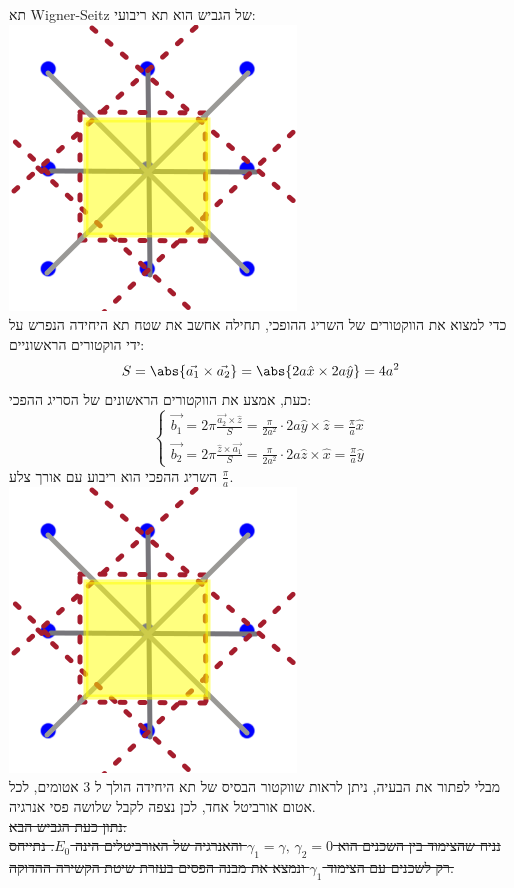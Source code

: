 \documentclass{article}
\begin{document}
\begin{Question}
תא Wigner-Seitz של הגביש הוא תא ריבועי:\\
\includegraphics[]{image/Q73.png}\\
כדי למצוא את הווקטורים של השריג ההופכי, תחילה אחשב את שטח תא היחידה הנפרש על ידי הוקטורים הראשוניים:
$$S=\abs{\vec{a_{1}}\times \vec{a_{2}}}=\abs{2a\hat{x}\times 2a\hat{y}}=4a^{2}
$$
כעת, אמצע את הווקטורים הראשונים של הסריג ההפכי:
$$\begin{cases}
    \vec{b_{1}}=2\pi\frac{\vec{a_{2}}\times\hat{z}}{S}=\frac{\pi}{2a^{2}}\cdot2a\hat{y}\times\hat{z}=\frac{\pi}{a}\hat{x}\\
    \vec{b_{2}}=2\pi\frac{\hat{z}\times\vec{a_{1}}}{S}=\frac{\pi}{2a^{2}}\cdot2a\hat{z}\times\hat{x}=\frac{\pi}{a}\hat{y}
\end{cases}
$$
השריג ההפכי הוא ריבוע עם אורך צלע $\frac{\pi}{a}$.\\
\includegraphics[]{image/Q73.png}\\
מבלי לפתור את הבעיה, ניתן לראות שווקטור הבסיס של תא היחידה הולך ל 3 אטומים, לכל אטום אורביטל אחד, לכן נצפה לקבל שלושה פסי אנרגיה.\\
\sout{
נתון כעת הגביש הבא:\\
נניח שהצימוד בין השכנים הוא $\gamma_{1}=\gamma,\, \gamma_{2}=0$ והאנרגיה של האורביטלים הינה $E_{0}$. נתייחס רק לשכנים עם הצימוד $\gamma_{1}$ ונמצא את מבנה הפסים בעזרת שיטת הקשירה ההדוקה.\\}


\end{Question}
\end{document}
